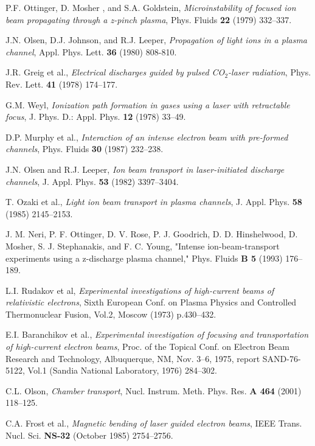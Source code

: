 \documentclass [12pt,a4paper,     ]{report} %
\begin{document}
\begin{enumerate}
 P.F. Ottinger, D. Mosher , and S.A. Goldstein, \emph{Microinstability of focused ion beam propagating through a z-pinch plasma}, Phys. Fluids {\bf 22} (1979) 332--337.

 J.N. Olsen, D.J. Johnson, and R.J. Leeper, \emph{Propagation of light ions in a plasma channel}, Appl. Phys. Lett. {\bf 36} (1980) 808-810.

 J.R. Greig et al., \emph{Electrical discharges guided by pulsed CO$_2$-laser radiation}, Phys. Rev. Lett. {\bf 41} (1978) 174--177.

 G.M. Weyl, \emph{Ionization path formation in gases using a laser with retractable focus},  J. Phys. D.: Appl. Phys. {\bf 12} (1978) 33--49.

 D.P. Murphy et al., \emph{Interaction of an intense electron beam with pre-formed channels}, Phys. Fluids {\bf 30} (1987) 232--238.

 J.N. Olsen and R.J. Leeper, \emph{Ion beam transport in laser-initiated discharge channels}, J. Appl. Phys. {\bf 53} (1982) 3397--3404.

 T. Ozaki et al., \emph{Light ion beam transport in plasma channels}, J. Appl. Phys. {\bf 58} (1985) 2145--2153.

 J. M. Neri, P. F. Ottinger, D. V. Rose, P. J. Goodrich, D. D. Hinshelwood, D. Mosher, S. J. Stephanakis, and F. C. Young, "Intense ion-beam-transport experiments using a z-discharge plasma channel,"
Phys. Fluids {\bf B 5} (1993) 176--189.

 L.I. Rudakov et al, \emph{Experimental investigations of high-current beams of relativistic electrons}, Sixth European Conf. on Plasma Physics and Controlled Thermonuclear Fusion, Vol.2, Moscow (1973) p.430--432.

 E.I. Baranchikov et al., \emph{Experimental investigation of focusing and transportation of high-current electron beams}, Proc. of the Topical Conf. on Electron Beam Research and Technology, Albuquerque, NM, Nov. 3--6, 1975, report SAND-76-5122, Vol.1 (Sandia National Laboratory, 1976) 284--302.

 C.L. Olson, \emph{Chamber transport}, Nucl. Instrum. Meth. Phys. Res. {\bf A 464} (2001) 118--125.

 C.A. Frost et al., \emph{Magnetic bending of laser guided electron beams}, IEEE Trans. Nucl. Sci. {\bf NS-32} (October 1985) 2754--2756.


\end{enumerate}
\end{document}
